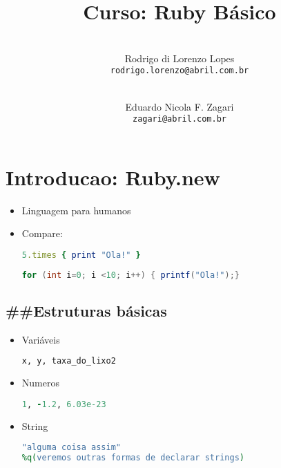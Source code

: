 \documentclass[serif,mathserif]{article}
\author{
    \\ Rodrigo di Lorenzo Lopes \\  \texttt{rodrigo.lorenzo@abril.com.br}
	\and 
    \\ Eduardo Nicola F. Zagari \\ \texttt{zagari@abril.com.br}
}
\title{Curso: Ruby Básico}
\begin{document}
\maketitle
 
\tableofcontents

\section{Introducao: Ruby.new}
\begin{frame} 

\begin{itemize}
\item Linguagem para humanos
\item Compare:
\begin{lstlisting}[language=ruby]
5.times { print "Ola!" }
\end{lstlisting}

\begin{lstlisting}[language=java]
for (int i=0; i <10; i++) { printf("Ola!");}
\end{lstlisting}

\end{itemize}

\end{frame}

\subsection{\#\#Estruturas básicas}
\begin{frame} 

\begin{itemize}
  \item Variáveis 
\begin{lstlisting}[language=ruby]
x, y, taxa_do_lixo2
\end{lstlisting}
   \item{Numeros}
\begin{lstlisting}[language=ruby]
1, -1.2, 6.03e-23    
\end{lstlisting}
	\item {String}
\begin{lstlisting}[language=ruby]
"alguma coisa assim"
%q(veremos outras formas de declarar strings)
\end{lstlisting}
 
\end{itemize}

\end{frame}
\end{document}
